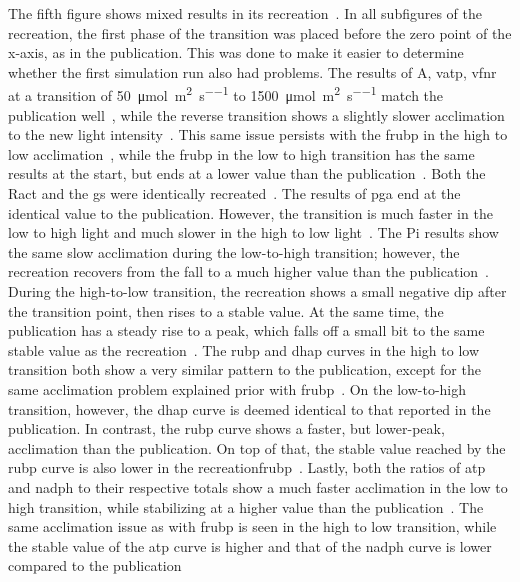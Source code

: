 The fifth figure shows mixed results in its recreation~. In all subfigures of the recreation, the first phase of the transition was placed before the zero point of the x-axis, as in the publication. This was done to make it easier to determine whether the first simulation run also had problems. The results of \gls{A}, \gls{vatp}, \gls{vfnr} at a transition of \qty{50}{\micro\mol\per\square\meter\per\second} to \qty{1500}{\micro\mol\per\square\meter\per\second} match the publication well~, while the reverse transition shows a slightly slower acclimation to the new light intensity~. This same issue persists with the \gls{frubp} in the high to low acclimation~, while the \gls{frubp} in the low to high transition has the same results at the start, but ends at a lower value than the publication~. Both the \gls{Ract} and the \gls{gs} were identically recreated~. The results of \gls{pga} end at the identical value to the publication. However, the transition is much faster in the low to high light and much slower in the high to low light~. The \gls{Pi} results show the same slow acclimation during the low-to-high transition; however, the recreation recovers from the fall to a much higher value than the publication~. During the high-to-low transition, the recreation shows a small negative dip after the transition point, then rises to a stable value. At the same time, the publication has a steady rise to a peak, which falls off a small bit to the same stable value as the recreation~. The \gls{rubp} and \gls{dhap} curves in the high to low transition both show a very similar pattern to the publication, except for the same acclimation problem explained prior with \gls{frubp}~. On the low-to-high transition, however, the \gls{dhap} curve is deemed identical to that reported in the publication. In contrast, the \gls{rubp} curve shows a faster, but lower-peak, acclimation than the publication. On top of that, the stable value reached by the \gls{rubp} curve is also lower in the recreation\gls{frubp}~. Lastly, both the ratios of \gls{atp} and \gls{nadph} to their respective totals show a much faster acclimation in the low to high transition, while stabilizing at a higher value than the publication~. The same acclimation issue as with \gls{frubp} is seen in the high to low transition, while the stable value of the \gls{atp} curve is higher and that of the \gls{nadph} curve is lower compared to the publication~

